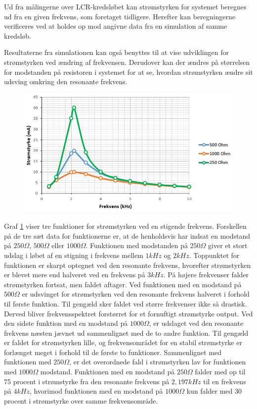 Ud fra målingerne over LCR-kredsløbet kan strømstyrken for systemet beregnes ud fra en given frekvens, som foretaget tidligere. Herefter kan beregningerne verificeres ved at holdes op mod angivne data fra en simulation af samme kredsløb.

Resultaterne fra simulationen kan også benyttes til at vise udviklingen for strømstyrken ved ændring af frekvensen. Derudover kan der ændres på størrelsen for modstanden på resistoren i systemet for at se, hvordan strømstyrken ændre sit udsving omkring den resonante frekvens.

\begin{figure}[H]
\centering
\includegraphics[scale=0.75]{Vildledning/Schematics/Graf_forsg1}
\caption{}
\label{figure:forsg1}
\end{figure}

Graf \ref{figure:forsg1} viser tre funktioner for strømstyrken ved en stigende frekvens. Forskellen på de tre sæt data for funktionerne er, at de henholdsvis har indsat en modstand på $250 \Omega$, $500 \Omega$ eller $1000 \Omega$. Funktionen med modstanden på $250 \Omega$ giver et stort udslag i løbet af en stigning i frekvens mellem $1 kHz$ og $2 kHz$. Toppunktet for funktionen er skarpt optegnet ved den resonante frekvens, hvorefter strømstyrken er blevet mere end halveret ved en frekvens på $3 kHz$. På højere frekvenser falder strømstyrken fortsat, men faldet aftager. Ved funktionen med en modstand på $500 \Omega$ er udsvinget for strømstyrken ved den resonante frekvens halveret i forhold til første funktion. Til gengæld sker faldet ved større frekvenser ikke så drastisk. Derved bliver frekvensspektret forstørret for et fornuftigt strømstyrke output. Ved den sidste funktion med en modstand på $1000 \Omega$, er udslaget ved den resonante frekvens næsten jævnet ud sammenlignet med de to andre funktion. Til gengæld er faldet for strømstyrken lille, og frekvensområdet for en stabil strømstyrke er forlænget meget i forhold til de første to funktioner. Sammenlignet med funktionen med $250 \Omega$, er det overordnede fald i strømstyrken lav for funktionen med $1000 \Omega$ modstand. Funktionen med en modstand på $250 \Omega$ falder med op til 75 procent i strømstyrke fra den resonante frekvens på $2,197 kHz$ til en frekvens på $4 kHz$, hvorimod funktionen med en modstand på $1000 \Omega$ kun falder med 30 procent i strømstyrke over samme frekvensområde.

